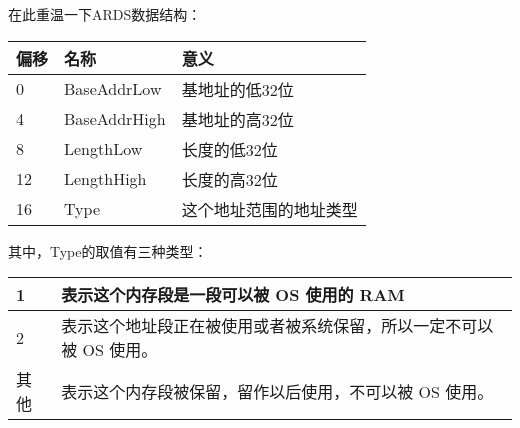 \documentclass[a4paper,left=2.5cm,right=2.5cm,11pt]{article}
\newcommand{\interval}{\vspace{0.5em}}
\begin{document}
	在此重温一下ARDS数据结构：
	\interval
	\begin{longtable}{p{2cm}|p{3cm}|p{5cm}}
	\hline
	偏移 & 名称 & 意义 \\
	\hline
	0 & BaseAddrLow & 基地址的低32位 \\
	\hline
	4 & BaseAddrHigh & 基地址的高32位 \\
	\hline
	8 & LengthLow & 长度的低32位 \\
	\hline
	12 & LengthHigh & 长度的高32位 \\
	\hline
	16 & Type & 这个地址范围的地址类型 \\
	\hline
	\end{longtable}
	\interval

	其中，Type的取值有三种类型：
	\interval
	\begin{longtable}{p{1cm}p{8cm}}
	\hline
	1 & 表示这个内存段是一段可以被 OS 使用的 RAM \\
	\hline
	2 & 表示这个地址段正在被使用或者被系统保留，所以一定不可以被 OS 使用。\\
	\hline
	其他 & 表示这个内存段被保留，留作以后使用，不可以被 OS 使用。\\
	\hline
	\end{longtable}
	\interval
\end{document}
